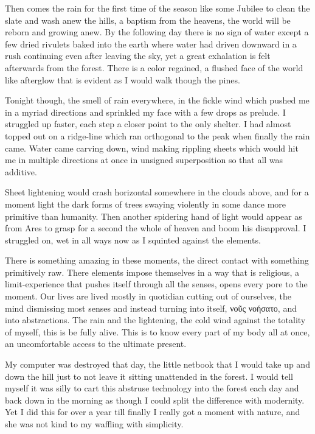 \documentclass[ebook, 10pt, openright, onecolumn]{memoir}
\newcommand{\textgreek}[1]{\begingroup\fontencoding{LGR}\selectfont#1\endgroup}
\newlength{\drop}
\begin{document}
Then comes the rain for the first time of the season like some Jubilee to clean
the slate and wash anew the hills, a baptism from the heavens, the world will be
reborn and growing anew.  By the following day there is no sign of water except
a few dried rivulets baked into the earth where water had driven downward in a
rush continuing even after leaving the sky, yet a great exhalation is felt
afterwards from the forest.  There is a color regained, a flushed face of the
world like afterglow that is evident as I would walk though the pines.

Tonight though, the smell of rain everywhere, in the fickle wind which pushed me
in a myriad directions and sprinkled my face with a few drops as prelude.  I
struggled up faster, each step a closer point to the only shelter.  I had almost
topped out on a ridge-line which ran orthogonal to the peak when finally the
rain came.  Water came carving down,  wind making rippling
sheets which would hit me in multiple directions at once in unsigned
superposition so that all was additive.

Sheet lightening would crash horizontal somewhere in the clouds above, and for a
moment light the dark forms of trees swaying violently in some dance more
primitive than humanity.  Then another spidering hand of light would appear as
from Ares to grasp for a second the whole of heaven and boom his disapproval.  I
struggled on, wet in all ways now as I squinted against the elements. 

There is something amazing in these moments, the direct contact with something
primitively raw.  There elements impose themselves in a way that is religious, a
limit-experience that pushes itself through all the senses, opens every pore to
the moment.  Our lives are lived mostly in quotidian cutting out of ourselves,
the mind dismissing most senses and instead turning into itself, \textgreek{νοῦς
  νοήσατο},  and into abstractions.  The rain and the lightening, the cold
wind against the totality of myself, this is be fully alive.  This is to know
every part of my body all at once, an uncomfortable access to the ultimate
present.

My computer was destroyed that day, the little netbook that I would take up and
down the hill just to not leave it sitting unattended in the forest.  I would
tell myself it was silly to cart this abstruse technology into the forest each
day and back down in the morning as though I could split the difference with
modernity.  Yet I did this for over a year till finally I really got a moment
with nature, and she was not kind to my waffling with simplicity.  
\end{document}
